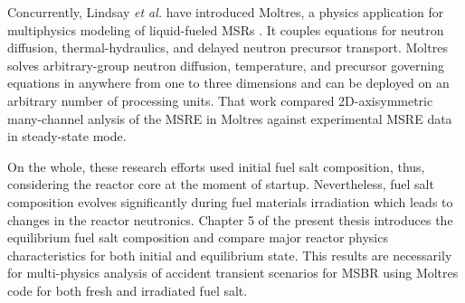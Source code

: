 Concurrently, Lindsay \emph{et al.} have introduced Moltres, a physics application for multiphysics modeling of liquid-fueled \glspl{MSR} \cite{lindsay_introduction_2018}. It couples equations for neutron diffusion, thermal-hydraulics, and delayed neutron precursor transport. Moltres solves arbitrary-group neutron diffusion, temperature, and precursor governing equations in anywhere from one to three dimensions and can be deployed on an arbitrary number of processing units. That work compared 2D-axisymmetric many-channel anlysis of the \gls{MSRE} in Moltres against experimental \gls{MSRE} data in steady-state mode.

On the whole, these research efforts used initial fuel salt composition, thus, considering the reactor core at the moment of startup. Nevertheless, fuel salt composition evolves significantly during fuel materials irradiation which leads to changes in the reactor neutronics. Chapter 5 of the present thesis introduces the equilibrium fuel salt composition and compare major reactor physics characteristics for both initial and equilibrium state. This results are necessarily for multi-physics analysis of accident transient scenarios for \gls{MSBR} using Moltres code for both fresh and irradiated fuel salt.

